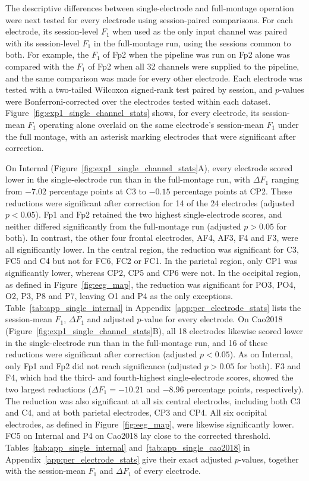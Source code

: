 \documentclass[journal,twoside,web]{ieeecolor}
\begin{document}
%
The descriptive differences between single-electrode and full-montage operation were next tested for every electrode using session-paired comparisons. For each electrode, its session-level $F_1$ when used as the only input channel was paired with its session-level $F_1$ in the full-montage run, using the sessions common to both. For example, the $F_1$ of Fp2 when the pipeline was run on Fp2 alone was compared with the $F_1$ of Fp2 when all 32 channels were supplied to the pipeline, and the same comparison was made for every other electrode.
%
Each electrode was tested with a two-tailed Wilcoxon signed-rank test paired by session, and $p$-values were Bonferroni-corrected over the electrodes tested within each dataset.
Figure~\ref{fig:exp1_single_channel_stats} shows, for every electrode, its session-mean $F_1$ operating alone overlaid on the same electrode's session-mean $F_1$ under the full montage, with an asterisk marking electrodes that were significant after correction.
 
%
On Internal (Figure~\ref{fig:exp1_single_channel_stats}A), every electrode scored lower in the single-electrode run than in the full-montage run, with $\Delta F_1$ ranging from $-7.02$ percentage points at C3 to $-0.15$ percentage points at CP2. These reductions were significant after correction for 14 of the 24 electrodes (adjusted $p < 0.05$). Fp1 and Fp2 retained the two highest single-electrode scores, and neither differed significantly from the full-montage run (adjusted $p > 0.05$ for both). In contrast, the other four frontal electrodes, AF4, AF3, F4 and F3, were all significantly lower. In the central region, the reduction was significant for C3, FC5 and C4 but not for FC6, FC2 or FC1. In the parietal region, only CP1 was significantly lower, whereas CP2, CP5 and CP6 were not. In the occipital region, as defined in Figure~\ref{fig:eeg_map}, the reduction was significant for PO3, PO4, O2, P3, P8 and P7, leaving O1 and P4 as the only exceptions. Table~\ref{tab:app_single_internal} in Appendix~\ref{app:per_electrode_stats} lists the session-mean $F_1$, $\Delta F_1$ and adjusted $p$-value for every electrode.
On Cao2018 (Figure~\ref{fig:exp1_single_channel_stats}B), all 18 electrodes likewise scored lower in the single-electrode run than in the full-montage run, and 16 of these reductions were significant after correction (adjusted $p < 0.05$). As on Internal, only Fp1 and Fp2 did not reach significance (adjusted $p > 0.05$ for both). F3 and F4, which had the third- and fourth-highest single-electrode scores, showed the two largest reductions ($\Delta F_1 = -10.21$ and $-8.96$ percentage points, respectively). The reduction was also significant at all six central electrodes, including both C3 and C4, and at both parietal electrodes, CP3 and CP4. All six occipital electrodes, as defined in Figure~\ref{fig:eeg_map}, were likewise significantly lower. FC5 on Internal and P4 on Cao2018 lay close to the corrected threshold. Tables~\ref{tab:app_single_internal} and~\ref{tab:app_single_cao2018} in Appendix~\ref{app:per_electrode_stats} give their exact adjusted $p$-values, together with the session-mean $F_1$ and $\Delta F_1$ of every electrode.
 
\end{document}
